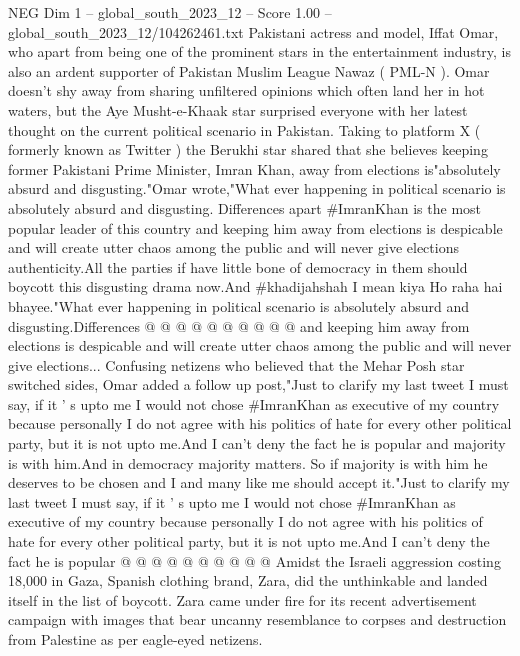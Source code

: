 \begin{textsample}{NEG Dim 1 – global\_south\_2023\_12 – Score 1.00 – global\_south\_2023\_12/104262461.txt}  \label{ex:f1_neg_418}
Pakistani actress and model, Iffat Omar, who apart from being one of the prominent stars in the entertainment industry, is also an ardent supporter of Pakistan Muslim League Nawaz ( PML-N ).
Omar doesn't shy away from sharing unfiltered opinions which often land her in hot waters, but the Aye Musht-e-Khaak star surprised everyone with her latest thought on the current political scenario in Pakistan.
Taking to platform X ( formerly known as Twitter ) the Berukhi star shared that she believes keeping former Pakistani Prime Minister, Imran Khan, away from elections is"absolutely absurd and disgusting."Omar wrote,"What ever happening in political scenario is absolutely absurd and disgusting.
Differences apart \#ImranKhan is the most popular leader of this country and keeping him away from elections is despicable and will create utter chaos among the public and will never give elections authenticity.All the parties if have little bone of democracy in them should boycott this disgusting drama now.And \#khadijahshah I mean kiya Ho raha hai bhayee."What ever happening in political scenario is absolutely absurd and disgusting.Differences @ @ @ @ @ @ @ @ @ @ and keeping him away from elections is despicable and will create utter chaos among the public and will never give elections...
Confusing netizens who believed that the Mehar Posh star switched sides, Omar added a follow up post,"Just to clarify my last tweet I must say, if it ' s upto me I would not chose \#ImranKhan as executive of my country because personally I do not agree with his politics of hate for every other political party, but it is not upto me.And I can't deny the fact he is popular and majority is with him.And in democracy majority matters.
So if majority is with him he deserves to be chosen and I and many like me should accept it."Just to clarify my last tweet I must say, if it ' s upto me I would not chose \#ImranKhan as executive of my country because personally I do not agree with his politics of hate for every other political party, but it is not upto me.And I can't deny the fact he is popular @ @ @ @ @ @ @ @ @ @ Amidst the Israeli aggression costing 18,000 in Gaza, Spanish clothing brand, Zara, did the unthinkable and landed itself in the list of boycott.
Zara came under fire for its recent advertisement campaign with images that bear uncanny resemblance to corpses and destruction from Palestine as per eagle-eyed netizens.

\end{textsample}
